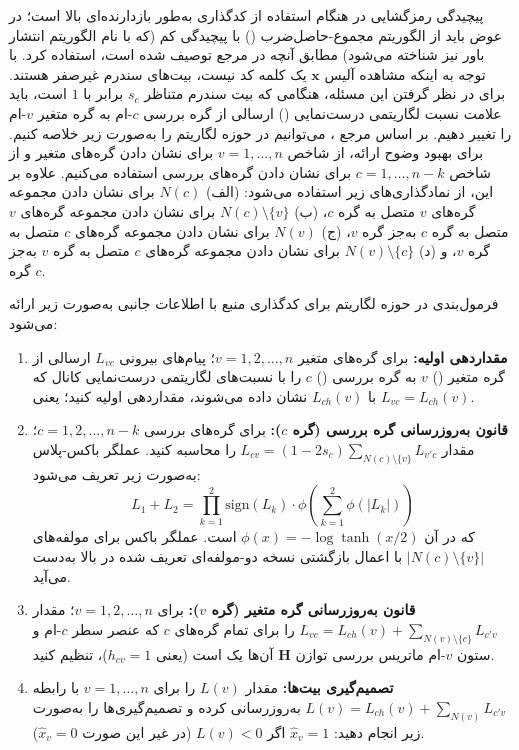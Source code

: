 پیچیدگی رمزگشایی  در هنگام استفاده از کدگذاری  به‌طور بازدارنده‌ای بالا است؛ در عوض باید از الگوریتم مجموع-حاصل‌ضرب () با پیچیدگی کم (که با نام الگوریتم انتشار باور نیز شناخته می‌شود) مطابق آنچه در مرجع \cite{107} توصیف شده است، استفاده کرد. با توجه به اینکه مشاهده آلیس $\bm{x}$ یک کلمه کد نیست، بیت‌های سندرم غیرصفر هستند. برای در نظر گرفتن این مسئله، هنگامی که بیت سندرم متناظر $s_c$ برابر با $1$ است، باید علامت نسبت لگاریتمی درست‌نمایی () ارسالی از گره بررسی $c$-ام به گره متغیر $v$-ام را تغییر دهیم. بر اساس مرجع \cite{108}، می‌توانیم  در حوزه لگاریتم را به‌صورت زیر خلاصه کنیم. برای بهبود وضوح ارائه، از شاخص $v = 1, \dots, n$ برای نشان دادن گره‌های متغیر و از شاخص $c = 1, \dots, n-k$ برای نشان دادن گره‌های بررسی استفاده می‌کنیم. علاوه بر این، از نمادگذاری‌های زیر استفاده می‌شود: (الف) $N(c)$ برای نشان دادن {مجموعه گره‌های $v$ متصل به گره $c$}، (ب) $N(c) \setminus \{v\}$ برای نشان دادن {مجموعه گره‌های $v$ متصل به گره $c$ به‌جز گره $v$}، (ج) $N(v)$ برای نشان دادن {مجموعه گره‌های $c$ متصل به گره $v$}، و (د) $N(v) \setminus \{c\}$ برای نشان دادن {مجموعه گره‌های $c$ متصل به گره $v$ به‌جز گره $c$}.

فرمول‌بندی  در حوزه لگاریتم برای کدگذاری منبع با اطلاعات جانبی به‌صورت زیر ارائه می‌شود:

\begin{enumerate}
	\item \textbf{مقداردهی اولیه:} برای گره‌های متغیر $v = 1, 2, \dots, n$؛ پیام‌های بیرونی $L_{vc}$ ارسالی از گره متغیر () $v$ به گره بررسی () $c$ را با نسبت‌های لگاریتمی درست‌نمایی کانال که با $L_{ch}(v)$ نشان داده می‌شوند، مقداردهی اولیه کنید؛ یعنی $L_{vc} = L_{ch}(v)$.
	\item \textbf{قانون به‌روزرسانی گره بررسی (گره $c$):} برای گره‌های بررسی $c = 1, 2, \dots, n-k$؛ مقدار $L_{cv} = (1 - 2s_c) \sum_{N(c) \setminus \{v\}} L_{v'c}$ را محاسبه کنید. عملگر باکس-پلاس به‌صورت زیر تعریف می‌شود:
	\begin{equation}
		L_1 + L_2 = \prod_{k=1}^2 \text{sign}(L_k) \cdot \phi \left( \sum_{k=1}^2 \phi(|L_k|) \right)
		\label{eq:6-60}
	\end{equation}
	که در آن $\phi(x) = -\log \tanh(x/2)$ است. عملگر باکس برای مولفه‌های $|N(c) \setminus \{v\}|$ با اعمال بازگشتی نسخه دو-مولفه‌ای تعریف شده در بالا به‌دست می‌آید.
	\item \textbf{قانون به‌روزرسانی گره متغیر (گره $v$):} برای $v = 1, 2, \dots, n$؛ مقدار $L_{vc} = L_{ch}(v) + \sum_{N(v) \setminus \{c\}} L_{c'v}$ را برای تمام گره‌های $c$ که عنصر سطر $c$-ام و ستون $v$-ام ماتریس بررسی توازن $\bm{H}$ آن‌ها یک است (یعنی $h_{cv} = 1$)، تنظیم کنید.
	\item \textbf{تصمیم‌گیری بیت‌ها:} مقدار $L(v)$ را برای $v = 1, \dots, n$ با رابطه $L(v) = L_{ch}(v) + \sum_{N(v)} L_{c'v}$ به‌روزرسانی کرده و تصمیم‌گیری‌ها را به‌صورت زیر انجام دهید:
	$\hat{x}_v = 1$ اگر $L(v) < 0$ (در غیر این صورت $\hat{x}_v = 0$).
\end{enumerate}

